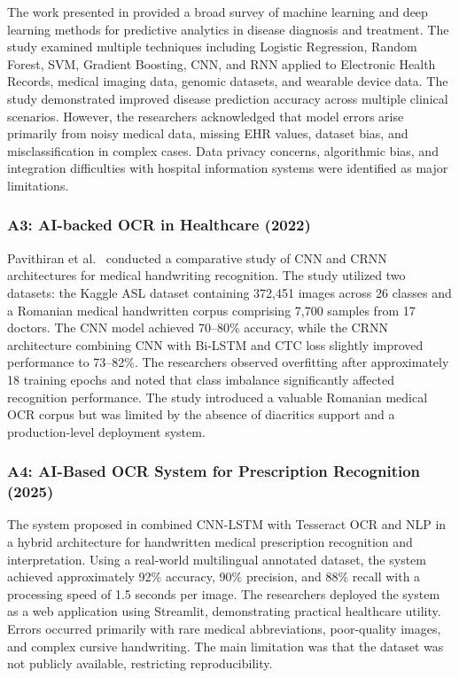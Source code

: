 \documentclass[conference]{IEEEtran}
\begin{document}
The work presented in \cite{gudi2025enhancing} provided a broad survey of machine learning and deep learning methods for predictive analytics in disease diagnosis and treatment. The study examined multiple techniques including Logistic Regression, Random Forest, SVM, Gradient Boosting, CNN, and RNN applied to Electronic Health Records, medical imaging data, genomic datasets, and wearable device data. The study demonstrated improved disease prediction accuracy across multiple clinical scenarios. However, the researchers acknowledged that model errors arise primarily from noisy medical data, missing EHR values, dataset bias, and misclassification in complex cases. Data privacy concerns, algorithmic bias, and integration difficulties with hospital information systems were identified as major limitations.

\subsubsection{A3: AI-backed OCR in Healthcare (2022)}

Pavithiran et al.\ \cite{gifu2022aibacked} conducted a comparative study of CNN and CRNN architectures for medical handwriting recognition. The study utilized two datasets: the Kaggle ASL dataset containing 372,451 images across 26 classes and a Romanian medical handwritten corpus comprising 7,700 samples from 17 doctors. The CNN model achieved 70--80\% accuracy, while the CRNN architecture combining CNN with Bi-LSTM and CTC loss slightly improved performance to 73--82\%. The researchers observed overfitting after approximately 18 training epochs and noted that class imbalance significantly affected recognition performance. The study introduced a valuable Romanian medical OCR corpus but was limited by the absence of diacritics support and a production-level deployment system.

\subsubsection{A4: AI-Based OCR System for Prescription Recognition (2025)}

The system proposed in \cite{gifu2022aibacked} combined CNN-LSTM with Tesseract OCR and NLP in a hybrid architecture for handwritten medical prescription recognition and interpretation. Using a real-world multilingual annotated dataset, the system achieved approximately 92\% accuracy, 90\% precision, and 88\% recall with a processing speed of 1.5 seconds per image. The researchers deployed the system as a web application using Streamlit, demonstrating practical healthcare utility. Errors occurred primarily with rare medical abbreviations, poor-quality images, and complex cursive handwriting. The main limitation was that the dataset was not publicly available, restricting reproducibility.
\end{document}

